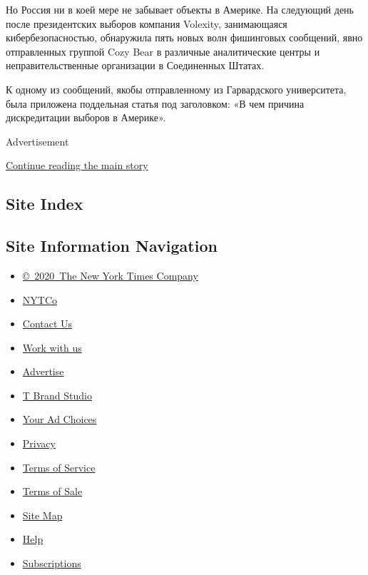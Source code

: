 Но Россия ни в коей мере не забывает объекты в Америке. На следующий
день после президентских выборов компания Volexity, занимающаяся
кибербезопасностью, обнаружила пять новых волн фишинговых сообщений,
явно отправленных группой Cozy Bear в различные аналитические центры и
неправительственные организации в Соединенных Штатах.

К одному из сообщений, якобы отправленному из Гарвардского университета,
была приложена поддельная статья под заголовком: «В чем причина
дискредитации выборов в Америке».

Advertisement

\protect\hyperlink{after-bottom}{Continue reading the main story}

\hypertarget{site-index}{%
\subsection{Site Index}\label{site-index}}

\hypertarget{site-information-navigation}{%
\subsection{Site Information
Navigation}\label{site-information-navigation}}

\begin{itemize}
\tightlist
\item
  \href{https://help.nytimes.com/hc/en-us/articles/115014792127-Copyright-notice}{©~2020~The
  New York Times Company}
\end{itemize}

\begin{itemize}
\tightlist
\item
  \href{https://www.nytco.com/}{NYTCo}
\item
  \href{https://help.nytimes.com/hc/en-us/articles/115015385887-Contact-Us}{Contact
  Us}
\item
  \href{https://www.nytco.com/careers/}{Work with us}
\item
  \href{https://nytmediakit.com/}{Advertise}
\item
  \href{http://www.tbrandstudio.com/}{T Brand Studio}
\item
  \href{https://www.nytimes.com/privacy/cookie-policy\#how-do-i-manage-trackers}{Your
  Ad Choices}
\item
  \href{https://www.nytimes.com/privacy}{Privacy}
\item
  \href{https://help.nytimes.com/hc/en-us/articles/115014893428-Terms-of-service}{Terms
  of Service}
\item
  \href{https://help.nytimes.com/hc/en-us/articles/115014893968-Terms-of-sale}{Terms
  of Sale}
\item
  \href{https://spiderbites.nytimes.com}{Site Map}
\item
  \href{https://help.nytimes.com/hc/en-us}{Help}
\item
  \href{https://www.nytimes.com/subscription?campaignId=37WXW}{Subscriptions}
\end{itemize}
